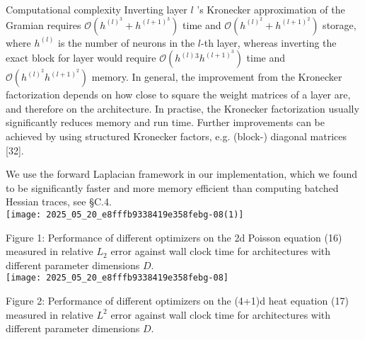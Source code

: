 \documentclass[10pt]{article}
\begin{document}
Computational complexity Inverting layer $l$ 's Kronecker approximation of the Gramian requires $\mathcal{O}\left(h^{(l)^{3}}+h^{(l+1)^{3}}\right)$ time and $\mathcal{O}\left(h^{(l)^{2}}+h^{(l+1)^{2}}\right)$ storage, where $h^{(l)}$ is the number of neurons in the $l$-th layer, whereas inverting the exact block for layer would require $\mathcal{O}\left(h^{(l)}{ }^{3} h^{(l+1)^{3}}\right)$ time and $\mathcal{O}\left(h^{(l)^{2}} h^{(l+1)^{2}}\right)$ memory. In general, the improvement from the Kronecker factorization depends on how close to square the weight matrices of a layer are, and therefore on the architecture. In practise, the Kronecker factorization usually significantly reduces memory and run time. Further improvements can be achieved by using structured Kronecker factors, e.g. (block-) diagonal matrices [32].

We use the forward Laplacian framework in our implementation, which we found to be significantly faster and more memory efficient than computing batched Hessian traces, see §C.4.\\
\texttt{[image: 2025\_05\_20\_e8fffb9338419e358febg-08(1)]}

Figure 1: Performance of different optimizers on the 2d Poisson equation (16) measured in relative $L_{2}$ error against wall clock time for architectures with different parameter dimensions $D$.\\
\texttt{[image: 2025\_05\_20\_e8fffb9338419e358febg-08]}

Figure 2: Performance of different optimizers on the (4+1)d heat equation (17) measured in relative $L^{2}$ error against wall clock time for architectures with different parameter dimensions $D$.
\end{document}
